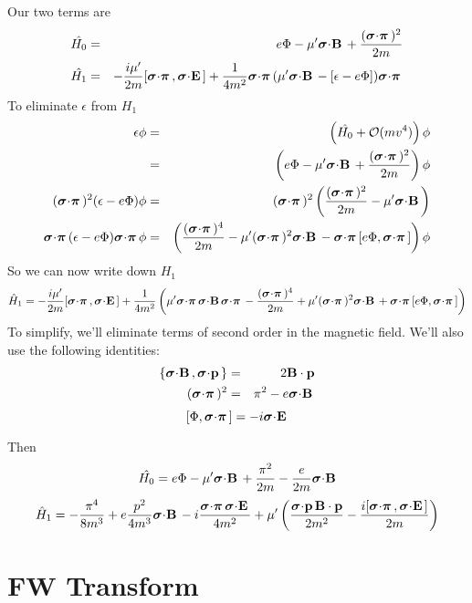 Our two terms are
\begin{eqnarray*}
	\hat{H_0} 
			&=&  e\Phi - \mu' \sigdot{B} + \frac{ (\sigdotg{\pi})^2}{2m}	\\
	\hat{H_1} 
			&=& -\frac{i\mu'}{2m}  [\sigdotg{\pi}, \sigdot{E}]
				+\frac{1}{4m^2} \sigdotg{\pi} (\mu' \sigdot{B} - [\epsilon - e\Phi]) \sigdotg{\pi} 
\end{eqnarray*}	
To eliminate $\epsilon$ from $H_1$
\begin{eqnarray*}
	\epsilon \phi
			&=& \left(\hat{H_0} + \mathcal{O}(mv^4) \right)\phi 										\\
			&=& \left(e\Phi - \mu' \sigdot{B} + \frac{ (\sigdotg{\pi})^2}{2m}	\right) \phi			\\
	(\sigdotg{\pi})^2 (\epsilon - e\Phi) \phi		
			&=&	(\sigdotg{\pi})^2 \left ( \frac{(\sigdotg{\pi})^2}{2m}- \mu' \sigdot{B} \right )		\\
	\sigdotg{\pi} (\epsilon - e\Phi) \sigdotg{\pi}\phi
			&=&	\left( \frac{(\sigdotg{\pi})^4}{2m} 
				- \mu' (\sigdotg{\pi})^2 \sigdot{B} 
				- \sigdotg{\pi}[e\Phi, \sigdotg{\pi}]\right ) \phi
\end{eqnarray*}
So we can now write down $H_1$
\[
	\hat{H}_1	=
		-\frac{i\mu'}{2m}  [\sigdotg{\pi}, \sigdot{E}]
		+\frac{1}{4m^2}\left(
			\mu' \sigdotg{\pi} \sigdot{B} \sigdotg{\pi}
			- \frac{(\sigdotg{\pi})^4}{2m} 
			+ \mu' (\sigdotg{\pi})^2 \sigdot{B} 
			+ \sigdotg{\pi}[e\Phi, \sigdotg{\pi}]
		\right)
\]
To simplify, we'll eliminate terms of second order in the magnetic field.  We'll also use the following identities:
\begin{eqnarray*}
\{ \mbox{\boldmath$ \sigma $} \hspace{-2pt} \cdot \hspace{-2pt} \mathbf{B} \,, \mbox{\boldmath$ \sigma $} \hspace{-2pt} \cdot \hspace{-2pt} \mathbf{p} \, \}	&=&		2\mathbf{B}\cdot \mathbf{p}	\\
(\mbox{\boldmath$ \sigma $} \hspace{-2pt} \cdot \hspace{-2pt} \mbox{\boldmath$ \pi $} \,)^2			&=&		\pi^2 - e\mbox{\boldmath$ \sigma $} \hspace{-2pt} \cdot \hspace{-2pt} \mathbf{B} \,		\\
\end{eqnarray*} 
\[	[\Phi, \mbox{\boldmath$ \sigma $} \hspace{-2pt} \cdot \hspace{-2pt} \mbox{\boldmath$ \pi $} \,]	= -i\mbox{\boldmath$ \sigma $} \hspace{-2pt} \cdot \hspace{-2pt} \mathbf{E} \, \]

Then
\[
	\hat{H_0} 
			=  e\Phi - \mu' \mbox{\boldmath$ \sigma $} \hspace{-2pt} \cdot \hspace{-2pt} \mathbf{B} \, + \frac{ \pi^2}{2m} - \frac{e}{2m} \mbox{\boldmath$ \sigma $} \hspace{-2pt} \cdot \hspace{-2pt} \mathbf{B} \,	\\
\]
\[
	\hat{H}_1	=
		- \frac{\pi^4}{8m^3}  
		+ e\frac{p^2}{4m^3} \sigdot{B}
		-i \frac{\sigdotg{\pi} \sigdot{E}}{4m^2} 
		+ \mu' \left(	
			\frac{ \sigdot{p} \v{B}\cdot \v{p} }{2m^2}
			-\frac{i[\sigdotg{\pi}, \sigdot{E}]}{2m} 
		\right )
\]


\section{FW Transform}

